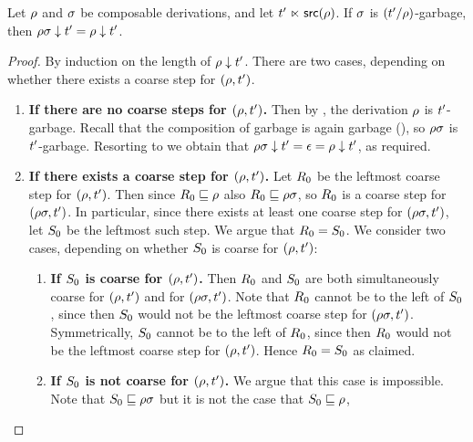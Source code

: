 \begin{lemma}
Let $\rho$ and $\sigma$ be composable derivations, and let $t' \mathrel{\ltimes} \mathsf{src}(\rho)$.
If $\sigma$ is $(t'/\rho)$-garbage, then $\rho\sigma \downarrow t' = \rho \downarrow t'$.
\end{lemma}
\begin{proof}
By induction on the length of $\rho \downarrow t'$.
There are two cases, depending on whether there exists a coarse step for $(\rho,t')$.
\begin{enumerate}
\item {\bf If there are no coarse steps for $(\rho,t')$.}
  Then by ,
  the derivation $\rho$ is $t'$-garbage.
    Recall that the composition of garbage is again garbage (),
  so $\rho\sigma$ is $t'$-garbage.
  Resorting to 
  we obtain that $\rho\sigma \downarrow t' = \epsilon = \rho \downarrow t'$,
  as required.
\item {\bf If there exists a coarse step for $(\rho,t')$.}
  Let $R_0$ be the leftmost coarse step for $(\rho,t')$.
  Then since $R_0 \sqsubseteq \rho$ also $R_0 \sqsubseteq \rho\sigma$,
  so $R_0$ is a coarse step for $(\rho\sigma,t')$.
  In particular, since there exists at least one coarse step for $(\rho\sigma,t')$,
  let $S_0$ be the leftmost such step.
  We argue that $R_0 = S_0$.
  We consider two cases, depending on whether $S_0$ is coarse for $(\rho,t')$:
  \begin{enumerate}
  \item {\bf If $S_0$ is coarse for $(\rho,t')$.}
    Then $R_0$ and $S_0$ are both simultaneously
    coarse for $(\rho,t')$ and for $(\rho\sigma,t')$.
    Note that $R_0$ cannot be to the left of $S_0$,
    since then $S_0$ would not be the leftmost coarse step for $(\rho\sigma,t')$.
    Symmetrically, $S_0$ cannot be to the left of $R_0$,
    since then $R_0$ would not be the leftmost coarse step for $(\rho,t')$.
    Hence $R_0 = S_0$ as claimed.
  \item {\bf If $S_0$ is not coarse for $(\rho,t')$.}
    We argue that this case is impossible.
    Note that $S_0 \sqsubseteq \rho\sigma$ but it is not the case that $S_0 \sqsubseteq \rho$,

\end{enumerate}
\end{enumerate}
\end{proof}
